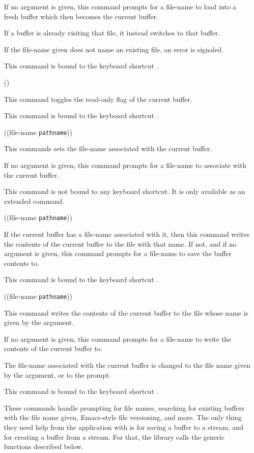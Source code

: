 If no argument is given, this command prompts for a file-name to load
into a fresh buffer which then becomes the current buffer.

If a buffer is already visiting that file, it instead switches to that
buffer.

If the file-name given does not name an existing file, an error is
signaled.

This command is bound to the keyboard shortcut .

 {()}

This command toggles the read-only flag of the current buffer.

This command is bound to the keyboard shortcut .

 {((file-name
  \texttt{pathname}))}

This commands sets the file-name associated with the current buffer.

If no argument is given, this command prompts for a file-name to
associate with the current buffer.

This command is not bound to any keyboard shortcut.  It is only
available as an extended command.

 {((file-name \texttt{pathname}))}

If the current buffer has a file-name associated with it, then this
command writes the contents of the current buffer to the file with
that name.  If not, and if no argument is given, this command prompts
for a file-name to save the buffer contents to.

This command is bound to the keyboard shortcut .

 {((file-name \texttt{pathname}))}

This command writes the contents of the current buffer to the file
whose name is given by the argument.

If no argument is given, this command prompts for a file-name to
write the contents of the current buffer to.

The file-name associated with the current buffer is changed to the
file name given by the argument, or to the prompt.

This command is bound to the keyboard shortcut .

These commands handle prompting for file names, searching for existing
buffers with the file name given, Emacs-style file versioning, and
more.  The only thing they need help from the application with is for
saving a buffer to a stream, and for creating a buffer from a stream.
For that, the \sysname{} library calls the generic functions described
below.

